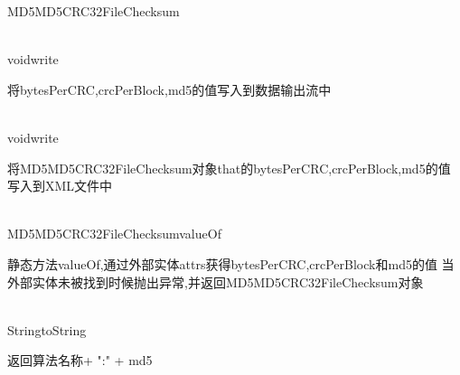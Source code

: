 \begin{XeClass}{MD5MD5CRC32FileChecksum}
  \begin{XeMethod}{\XePublic\\ }{void}{write}
       
 将bytesPerCRC,crcPerBlock,md5的值写入到数据输出流中

  \end{XeMethod}

  \begin{XeMethod}{\XePublic\\ }{void}{write}
       
 将MD5MD5CRC32FileChecksum对象that的bytesPerCRC,crcPerBlock,md5的值写入到XML文件中

  \end{XeMethod}

  \begin{XeMethod}{\XePublic\\ }{MD5MD5CRC32FileChecksum}{valueOf}
       
 静态方法valueOf,通过外部实体attrs获得bytesPerCRC,crcPerBlock和md5的值
 当外部实体未被找到时候抛出异常,并返回MD5MD5CRC32FileChecksum对象

  \end{XeMethod}

  \begin{XeMethod}{\XePublic\\ }{String}{toString}
       
 返回算法名称+ ":" + md5

  \end{XeMethod}

\end{XeClass}
